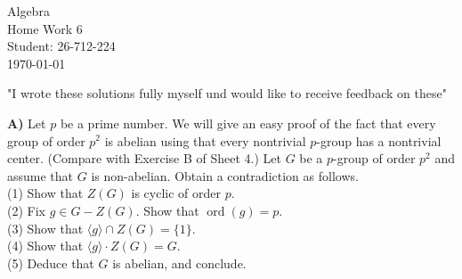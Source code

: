 \documentclass[12pt,a4paper]{article}
\begin{document}
\begin{titlepage}
\centering
\vspace*{\fill}
{\Huge Algebra} \\[0.5cm]
{\Huge Home Work 6}\\[1.5cm]
{\Large Student: 26-712-224}\\[0.5cm]
{\Large \today}\par
\vspace{2cm}
{\normalsize "I wrote these solutions fully myself und would like to receive feedback on these"\par}
\vspace*{\fill}
\end{titlepage}

\newpage
\noindent
\textbf{A)} Let $p$ be a prime number. We will give an easy proof of the fact that
 every group of order $p^2$ is abelian using that every nontrivial $p$-group has
 a nontrivial center. (Compare with Exercise B of Sheet 4.) Let $G$ be a
 $p$-group of order $p^2$ and assume that $G$ is non-abelian. Obtain a
 contradiction as follows.\\[0.6em]
(1) Show that $Z(G)$ is cyclic of order $p$.\\
(2) Fix $g\in G-Z(G)$. Show that $\operatorname{ord}(g)=p$.\\
(3) Show that $\langle g\rangle\cap Z(G)=\{1\}$.\\
(4) Show that $\langle g\rangle\cdot Z(G)=G$.\\
(5) Deduce that $G$ is abelian, and conclude.
\end{document}
